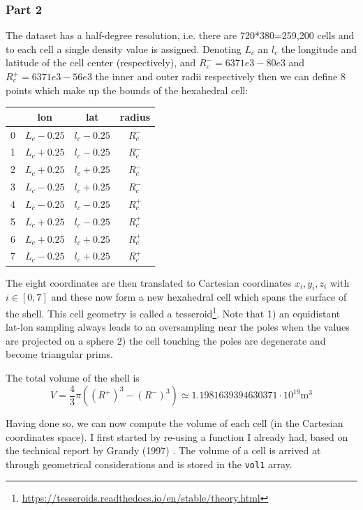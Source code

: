 \subsubsection*{Part 2}

The dataset has a half-degree resolution, i.e.
there are 720*380=259,200 cells and to each cell a single density
value is assigned. Denoting $L_c$ an $l_c$ the longitude and latitude
of the cell center (respectively), and $R^-_c=6371e3-80e3$ and 
$R^+_c=6371e3-56e3$ the inner and outer radii respectively then we can 
define 8 points which make up the bounds of the hexahedral cell:

\begin{tabular}{lccc}
\hline 
  & lon & lat & radius \\
\hline 
0 & $L_c-0.25$ & $l_c-0.25$ & $R_c^-$ \\
1 & $L_c+0.25$ & $l_c-0.25$ & $R_c^-$ \\
2 & $L_c+0.25$ & $l_c+0.25$ & $R_c^-$ \\
3 & $L_c-0.25$ & $l_c+0.25$ & $R_c^-$ \\
4 & $L_c-0.25$ & $l_c-0.25$ & $R_c^+$ \\
5 & $L_c+0.25$ & $l_c-0.25$ & $R_c^+$ \\
6 & $L_c+0.25$ & $l_c+0.25$ & $R_c^+$ \\
7 & $L_c-0.25$ & $l_c+0.25$ & $R_c^+$ \\
\hline 
\end{tabular} 

The eight coordinates are then translated to Cartesian coordinates $x_i,y_i,z_i$ with $i\in[0,7]$
and these now form a new hexahedral cell which spans the surface of the shell. 
This cell geometry is called a 
tesseroid\footnote{\url{https://tesseroids.readthedocs.io/en/stable/theory.html}}.
Note that 1) an equidistant lat-lon sampling always leads to an oversampling 
near the poles when the values are projected on a sphere 2) the cell touching the poles 
are degenerate and become triangular prims. 

The total volume of the shell is 
\[
V = \frac{4}{3}\pi ((R^+)^3-(R^-)^3) \simeq 1.1981639394630371 \cdot 10^{19} \si{\cubic\metre}
\]



Having done so, we can now compute the volume of each cell (in the Cartesian coordinates space). 
I first started by re-using a function I already had, based on the technical report by Grandy 
(1997) \cite{gran97}. The volume of a cell is arrived at through geometrical considerations and
is stored in the {\tt vol1} array. 

